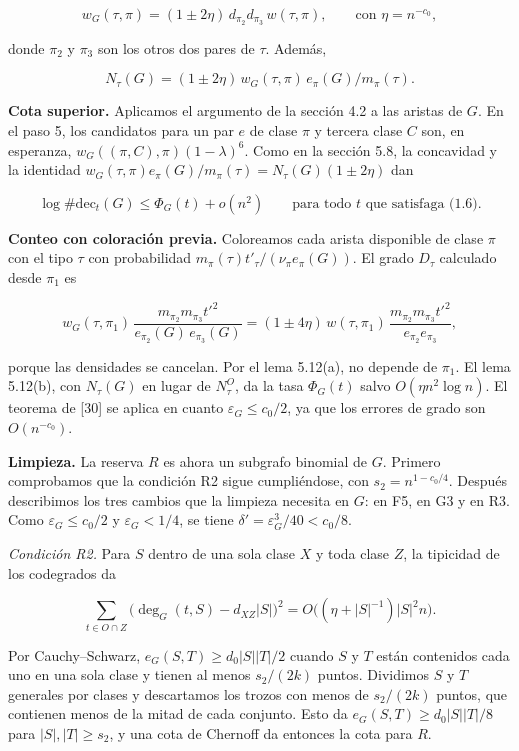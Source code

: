\documentclass[spanish,11pt,a4paper]{article}
\begin{document}
\nopagebreak[4]
\[w_G(\tau,\pi)=(1\pm2\eta)\,d_{\pi_2}d_{\pi_3}\,w(\tau,\pi),\qquad\text{con }\eta=n^{-c_0},\]

donde \(\pi_2\) y \(\pi_3\) son los otros dos pares de \(\tau\). Además,

\nopagebreak[4]
\[N_\tau(G)=(1\pm2\eta)\,w_G(\tau,\pi)\,e_\pi(G)/m_\pi(\tau).\]

\textbf{Cota superior.} Aplicamos el argumento de la sección 4.2 a las aristas de \(G\). En el paso 5, los candidatos para un par \(e\) de clase \(\pi\) y tercera clase \(C\) son, en esperanza, \(w_G((\pi,C),\pi)(1-\lambda)^6\). Como en la sección 5.8, la concavidad y la identidad \(w_G(\tau,\pi)e_\pi(G)/m_\pi(\tau)=N_\tau(G)(1\pm2\eta)\) dan

\nopagebreak[4]
\[\log\#\mathrm{dec}_t(G)\le\Phi_G(t)+o(n^2)\qquad\text{para todo $t$ que satisfaga (1.6).}\tag{5.4}\]

\textbf{Conteo con coloración previa.} Coloreamos cada arista disponible de clase \(\pi\) con el tipo \(\tau\) con probabilidad \(m_\pi(\tau)t'_\tau/(\nu_\pi e_\pi(G))\). El grado \(D_\tau\) calculado desde \(\pi_1\) es

\nopagebreak[4]
\[w_G(\tau,\pi_1)\,\frac{m_{\pi_2}m_{\pi_3}t'^2}{e_{\pi_2}(G)\,e_{\pi_3}(G)}
=(1\pm4\eta)\,w(\tau,\pi_1)\,\frac{m_{\pi_2}m_{\pi_3}t'^2}{e_{\pi_2}e_{\pi_3}},\]

porque las densidades se cancelan. Por el lema 5.12(a), no depende de \(\pi_1\). El lema 5.12(b), con \(N_\tau(G)\) en lugar de \(N^O_\tau\), da la tasa \(\Phi_G(t)\) salvo \(O(\eta n^2\log n)\). El teorema de {[}30{]} se aplica en cuanto \(\varepsilon_G\le c_0/2\), ya que los errores de grado son \(O(n^{-c_0})\).

\textbf{Limpieza.} La reserva \(R\) es ahora un subgrafo binomial de \(G\). Primero comprobamos que la condición R2 sigue cumpliéndose, con \(s_2=n^{1-c_0/4}\). Después describimos los tres cambios que la limpieza necesita en \(G\): en F5, en G3 y en R3. Como \(\varepsilon_G\le c_0/2\) y \(\varepsilon_G<1/4\), se tiene \(\delta'=\varepsilon_G^3/40<c_0/8\).

\emph{Condición R2.} Para \(S\) dentro de una sola clase \(X\) y toda clase \(Z\), la tipicidad de los codegrados da

\nopagebreak[4]
\[\sum_{t\in O\cap Z}\bigl(\deg_G(t,S)-d_{XZ}|S|\bigr)^2=O\bigl((\eta+|S|^{-1})|S|^2n\bigr).\]

Por Cauchy--Schwarz, \(e_G(S,T)\ge d_0|S||T|/2\) cuando \(S\) y \(T\) están contenidos cada uno en una sola clase y tienen al menos \(s_2/(2k)\) puntos. Dividimos \(S\) y \(T\) generales por clases y descartamos los trozos con menos de \(s_2/(2k)\) puntos, que contienen menos de la mitad de cada conjunto. Esto da \(e_G(S,T)\ge d_0|S||T|/8\) para \(|S|,|T|\ge s_2\), y una cota de Chernoff da entonces la cota para \(R\).
\end{document}
